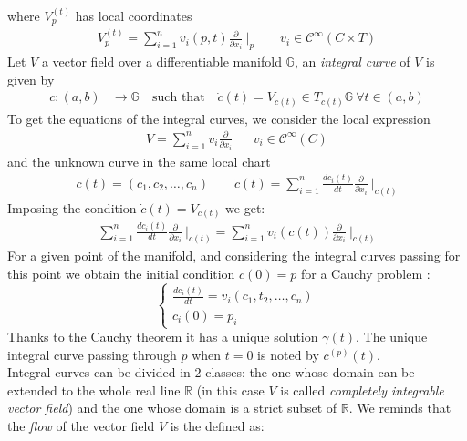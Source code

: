 where $V^{(t)}_{p} $ has local coordinates
\begin{align*}
V^{(t)}_{p} 
=\sum_{i=1}^{n}v_{i}(p,t) \frac{\partial}{\partial x_{i}}~\Bigr|_{p} 
\qquad  
v_{i} \in \mathcal{C}^{\infty}(C\times T)
\end{align*}
Let $V$ a vector field over a differentiable manifold $\mathbb{G}$, an \emph{integral curve} of $V$ is given by
\begin{align*}
c : (a,b) & \longrightarrow  \mathbb{G}  \quad \text{such that} \quad 
\dot{c}(t) = V_{c(t)} \in T_{c(t)}\mathbb{G} ~\forall t\in (a,b)
\end{align*}
To get the equations of the integral curves, we consider the local expression
\begin{align*}
V
= 
\sum_{i=1}^{n}v_{i} \frac{\partial}{\partial x_{i}} %
& & 
v_{i} \in \mathcal{C}^{\infty}(C)
\end{align*}
and the unknown curve in the same local chart
\begin{align*}
c(t) = (c_{1}, c_{2}, \dots , c_{n})
\qquad
\dot{c}(t)  = \sum_{i=1}^{n}   \frac{dc_{i}(t)}{dt}   \frac{\partial}{\partial x_{i}} ~\Bigr|_{c(t)} 
\end{align*}
Imposing the condition $\dot{c}(t) = V_{c(t)} $ we get:
\begin{align*}
\sum_{i=1}^{n}   \frac{dc_{i}(t)}{dt}   \frac{\partial}{\partial x_{i}} ~\Bigr|_{c(t)} 
= 
\sum_{i=1}^{n} v_{i}(c(t)) \frac{\partial}{\partial x_{i}} ~\Bigr|_{c(t)}  
\end{align*}
For a given point of the manifold, and considering the integral curves passing for this point we obtain the initial condition $c(0) = p$ for a Cauchy problem :
\begin{equation}
\begin{cases}
\frac{dc_{i}(t)}{dt}  =v_{i}(c_{1}, t_{2}, \dots , c_{n})  \\
c_{i}(0) = p_{i}
\end{cases}
\end{equation}
Thanks to the Cauchy theorem it has a unique solution $\gamma(t)$. The unique integral curve passing through $p$ when $t=0$ is noted by $ c^{(p)}(t)$. \\
Integral curves can be divided in $2$ classes: the one whose domain can be extended to the whole real line $\mathbb{R}$ (in this case $V$ is called \emph{completely integrable vector field}) and the one whose domain is a strict subset of $\mathbb{R}$.
We reminds that the \emph{flow} of the vector field $V$ is the defined as:
